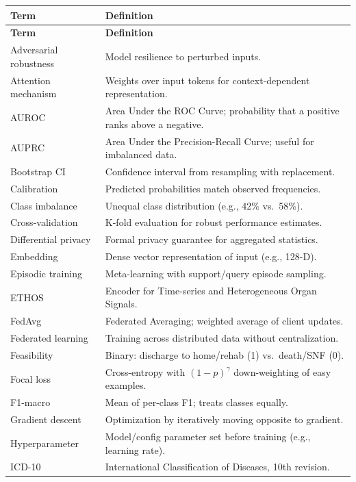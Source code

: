 \begin{longtable}{p{2.2cm}p{10cm}}
\toprule
\textbf{Term} & \textbf{Definition} \\
\midrule
\endfirsthead

\toprule
\textbf{Term} & \textbf{Definition} \\
\midrule
\endhead

Adversarial robustness & Model resilience to perturbed inputs. \\
Attention mechanism & Weights over input tokens for context-dependent representation. \\
AUROC & Area Under the ROC Curve; probability that a positive ranks above a negative. \\
AUPRC & Area Under the Precision-Recall Curve; useful for imbalanced data. \\
Bootstrap CI & Confidence interval from resampling with replacement. \\
Calibration & Predicted probabilities match observed frequencies. \\
Class imbalance & Unequal class distribution (e.g., 42\% vs.\ 58\%). \\
Cross-validation & K-fold evaluation for robust performance estimates. \\
Differential privacy & Formal privacy guarantee for aggregated statistics. \\
Embedding & Dense vector representation of input (e.g., 128-D). \\
Episodic training & Meta-learning with support/query episode sampling. \\
ETHOS & Encoder for Time-series and Heterogeneous Organ Signals. \\
FedAvg & Federated Averaging; weighted average of client updates. \\
Federated learning & Training across distributed data without centralization. \\
Feasibility & Binary: discharge to home/rehab (1) vs.\ death/SNF (0). \\
Focal loss & Cross-entropy with $(1-p)^\gamma$ down-weighting of easy examples. \\
F1-macro & Mean of per-class F1; treats classes equally. \\
Gradient descent & Optimization by iteratively moving opposite to gradient. \\
Hyperparameter & Model/config parameter set before training (e.g., learning rate). \\
ICD-10 & International Classification of Diseases, 10th revision. \\

\end{longtable}
